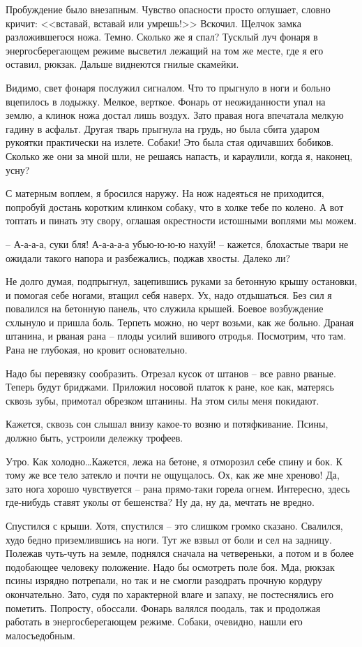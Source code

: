 \documentclass[a4paper]{book}
\begin{document}
Пробуждение было внезапным. Чувство опасности просто оглушает, словно кричит: <<вставай, вставай или умрешь!>> Вскочил. Щелчок замка разложившегося ножа. Темно. Сколько же я спал? Тусклый луч фонаря в энергосберегающем режиме высветил лежащий на том же месте, где я его оставил, рюкзак. Дальше виднеются гнилые скамейки. 

Видимо, свет фонаря послужил сигналом. Что то прыгнуло в ноги и больно вцепилось в лодыжку. Мелкое, верткое. Фонарь от неожиданности упал на землю, а клинок ножа достал лишь воздух. Зато правая нога впечатала мелкую гадину в асфальт. Другая тварь прыгнула на грудь, но была сбита ударом рукоятки практически на излете. Собаки! Это была стая одичавших бобиков. Сколько же они за мной шли, не решаясь напасть, и караулили, когда я, наконец, усну?

С матерным воплем, я бросился наружу. На нож надеяться не приходится, попробуй достань коротким клинком собаку, что в холке тебе по колено. А вот топтать и пинать эту свору, оглашая окрестности истошными воплями мы можем. 

-- А-а-а-а, суки бля! А-а-а-а-а убью-ю-ю-ю нахуй! -- кажется, блохастые твари не ожидали такого напора и разбежались, поджав хвосты. Далеко ли?

Не долго думая, подпрыгнул, зацепившись руками за бетонную крышу остановки, и помогая себе ногами, втащил себя наверх. Ух, надо отдышаться. Без сил я повалился на бетонную панель, что служила крышей. Боевое возбуждение схлынуло и пришла боль. Терпеть можно, но черт возьми, как же больно. Драная штанина, и рваная рана -- плоды усилий вшивого отродья. Посмотрим, что там. Рана не глубокая, но кровит основательно. 

Надо бы перевязку сообразить. Отрезал кусок от штанов -- все равно рваные. Теперь будут бриджами. Приложил носовой платок к ране, кое как, матерясь сквозь зубы, примотал обрезком штанины. На этом силы меня покидают.

Кажется, сквозь сон слышал внизу какое-то возню и потяфкивание. Псины, должно быть, устроили дележку трофеев.

Утро. Как холодно\ldots Кажется, лежа на бетоне, я отморозил себе спину и бок. К тому же все тело затекло и почти не ощущалось. Ох, как же мне хреново! Да, зато нога хорошо чувствуется -- рана прямо-таки горела огнем. Интересно, здесь где-нибудь ставят уколы от бешенства? Ну да, ну да, мечтать не вредно. 

Спустился с крыши. Хотя, спустился -- это слишком громко сказано. Свалился, худо бедно приземлившись на ноги. Тут же взвыл от боли и сел на задницу. Полежав чуть-чуть на земле, поднялся сначала на четвереньки, а потом и в более подобающее человеку положение. Надо бы осмотреть поле боя. Мда, рюкзак псины изрядно потрепали, но так и не смогли разодрать прочную кордуру окончательно. Зато, судя по характерной влаге и запаху, не постеснялись его пометить. Попросту, обоссали. Фонарь валялся поодаль, так и продолжая работать в энергосберегающем режиме. Собаки, очевидно, нашли его малосъедобным. 
\end{document}
